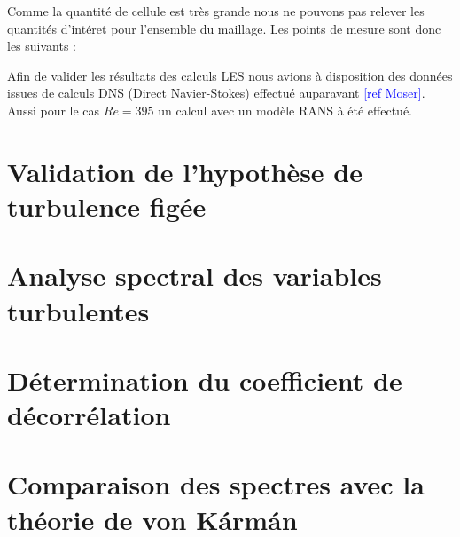\documentclass[12pt]{article}
\theoremstyle{plain}
\theoremstyle{remark}
\begin{document}
Comme la quantité de cellule est très grande nous ne pouvons pas relever les quantités d'intéret pour l'ensemble du maillage. Les points de mesure sont donc les suivants : 


Afin de valider les résultats des calculs LES nous avions à disposition des données issues de calculs DNS (Direct Navier-Stokes) effectué auparavant \textcolor{blue}{[ref Moser]}. Aussi pour le cas $Re = 395$ un calcul avec un modèle RANS à été effectué.



\section{Validation de l'hypothèse de turbulence figée}

\section{Analyse spectral des variables turbulentes}

\section{Détermination du coefficient de décorrélation}

\section{Comparaison des spectres avec la théorie de von Kármán}



	
	
	
	
	
	
\end{document}

